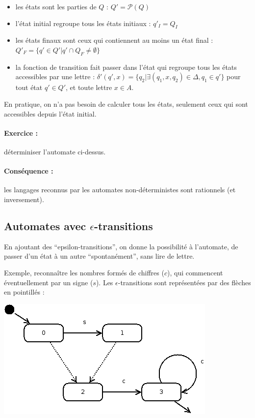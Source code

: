 \documentclass[10pt,twoside]{article}
\begin{document}
\begin{itemize}
 \item les états sont les parties de $Q$ : $Q' = \mathcal{P}(Q)$
\item l'état initial regroupe tous les états initiaux : $q'_I = Q_I$
\item les états finaux sont ceux qui contiennent au moins un état final : 
$Q'_F =  \{ q' \in Q' | q' \cap Q_F \neq \emptyset \}$
\item la fonction de transition fait passer dans l'état qui 
regroupe tous les états accessibles par une lettre :
$\delta'(q', x) = \{ q_2 | \exists (q_1, x, q_2) \in \Delta, q_1 \in q'\} $ 
pour tout état $q' \in Q'$, et toute lettre $x \in A$.
\end{itemize}

En pratique,  on n'a pas besoin de calculer tous les 
états, seulement ceux qui sont accessibles depuis l'état initial.

\paragraph{Exercice :} déterminiser l'automate ci-dessus.

\paragraph{Conséquence :} les langages reconnus par les
automates non-déterministes sont rationnels (et inversement).


\subsection{Automates avec $\epsilon$-transitions}

En ajoutant des ``epsilon-transitions'', on donne la possibilité à 
l'automate, de passer d'un état à un autre ``spontanément'', sans lire 
de lettre.

Exemple, reconnaître les nombres formés de chiffres ($c$), qui commencent
 éventuellement 
par un signe ($s$). Les $\epsilon$-transitions sont représentées par des flèches en pointillés :
\begin{center}
\includegraphics[width=0.6\linewidth]{../dia/nombre-signe-non-det}
\end{center}
\end{document}
